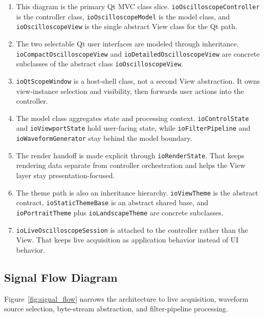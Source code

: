 \begin{enumerate}
    \item This diagram is the primary Qt MVC class slice. \texttt{ioOscilloscopeController} is the controller class, \texttt{ioOscilloscopeModel} is the model class, and \texttt{ioOscilloscopeView} is the single abstract View class for the Qt path.
    \item The two selectable Qt user interfaces are modeled through inheritance. \texttt{ioCompactOscilloscopeView} and \texttt{ioDetailedOscilloscopeView} are concrete subclasses of the abstract class \texttt{ioOscilloscopeView}.
    \item \texttt{ioQtScopeWindow} is a host-shell class, not a second View abstraction. It owns view-instance selection and visibility, then forwards user actions into the controller.
    \item The model class aggregates state and processing context. \texttt{ioControlState} and \texttt{ioViewportState} hold user-facing state, while \texttt{ioFilterPipeline} and \texttt{ioWaveformGenerator} stay behind the model boundary.
    \item The render handoff is made explicit through \texttt{ioRenderState}. That keeps rendering data separate from controller orchestration and helps the View layer stay presentation-focused.
    \item The theme path is also an inheritance hierarchy. \texttt{ioViewTheme} is the abstract contract, \texttt{ioStaticThemeBase} is an abstract shared base, and \texttt{ioPortraitTheme} plus \texttt{ioLandscapeTheme} are concrete subclasses.
    \item \texttt{ioLiveOscilloscopeSession} is attached to the controller rather than the View. That keeps live acquisition as application behavior instead of UI behavior.
\end{enumerate}

\subsection{Signal Flow Diagram}
\label{Section::Signal Flow Diagram}


Figure~\ref{fig:signal_flow} narrows the architecture to live acquisition, waveform source selection, byte-stream abstraction, and filter-pipeline processing.

